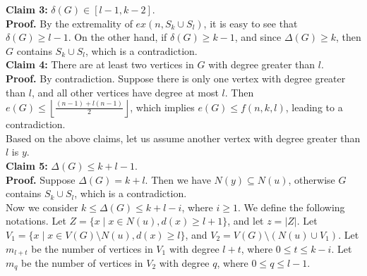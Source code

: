 \documentclass[12pt]{elsarticle}
\begin{document}
\textbf{Claim 3:} $\delta(G) \in [l - 1, k - 2]$. \\

\textbf{Proof.} By the extremality of $ex(n, S_{k} \cup S_{l})$, it is easy to see that $\delta(G) \ge l - 1$. On the other hand, if $\delta(G) \ge k - 1$, and since $\Delta(G) \ge k$, then $G$ contains $S_k \cup S_l$, which is a contradiction.   \\

\textbf{Claim 4:} There are at least two vertices in $G$ with degree greater than $l$. \\

\textbf{Proof.} By contradiction. Suppose there is only one vertex with degree greater than $l$, and all other vertices have degree at most $l$. Then $e(G) \le \left\lfloor \frac{(n - 1) + l(n - 1)}{2} \right\rfloor$, which implies $e(G) \le f(n, k, l) $, leading to a contradiction. \\

Based on the above claims, let us assume another vertex with degree greater than $l$ is $y$. \\

\textbf{Claim 5:} $\Delta(G) \le k + l - 1$. \\

\textbf{Proof.} Suppose $\Delta(G) = k + l$. Then we have $N(y) \subseteq N(u)$, otherwise $G$ contains $S_k \cup S_l$, which is a contradiction. \\

Now we consider $k \le \Delta(G) \le k + l - i$, where $i \ge 1$.
We define the following notations. Let $Z = \{x \mid x \in N(u), d(x) \ge l + 1\}$, and let $z = |Z|$. Let $V_1 = \{x \mid x \in V(G) \setminus N(u), d(x) \ge l\}$, and $V_2 = V(G) \setminus (N(u) \cup V_1)$. Let $m_{l+t}$ be the number of vertices in $V_1$ with degree $l + t$, where $0 \le t \le k - i$. Let $m_q$ be the number of vertices in $V_2$ with degree $q$, where $0 \le q \le l - 1$. 



    
    
\end{document}
